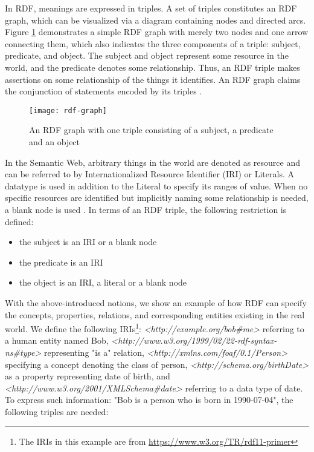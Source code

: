In RDF, meanings are expressed in triples. A set of triples constitutes an RDF graph, which can be visualized via a diagram containing nodes and directed arcs. Figure \ref{figure:rdf example} demonstrates a simple RDF graph with merely two nodes and one arrow connecting them, which also indicates the three components of a triple: subject, predicate, and object. The subject and object represent some resource in the world, and the predicate denotes some relationship. Thus, an RDF triple makes assertions on some relationship of the things it identifies. An RDF graph claims the conjunction of statements encoded by its triples \cite{Cyganiak2014}.

\begin{figure}[h]
\texttt{[image: rdf-graph]}
\centering
\caption{An RDF graph with one triple consisting of a subject, a predicate and an object \cite{Cyganiak2014}}
\label{figure:rdf example}
\end{figure}

In the Semantic Web, arbitrary things in the world are denoted as resource and can be referred to by Internationalized Resource Identifier (IRI) or Literals. A datatype is used in addition to the Literal to specify its ranges of value. When no specific resources are identified but implicitly naming some relationship is needed, a blank node is used \cite{Cyganiak2014}. In terms of an RDF triple, the following restriction is defined: 
\medskip
\begin{itemize}
\item the subject is an IRI or a blank node
\item the predicate is an IRI
\item the object is an IRI, a literal or a blank node
\end{itemize}

With the above-introduced notions, we show an example of how RDF can specify the concepts, properties, relations, and corresponding entities existing in the real world. We define the following IRIs\footnote{The IRIs in this example are from \url{https://www.w3.org/TR/rdf11-primer}}: \textit{<http://example.org/bob\#me>} referring to a human entity named Bob, \textit{<http://www.w3.org/1999/02/22-rdf-syntax-ns\#type>} representing "is a" relation, \textit{<http://xmlns.com/foaf/0.1/Person>} specifying a concept denoting the class of person, \textit{<http://schema.org/birthDate>} as a property representing date of birth, and \textit{<http://www.w3.org/2001/XMLSchema\#date>} referring to a data type of date. To express such information: "Bob is a person who is born in 1990-07-04", the following triples are needed:


